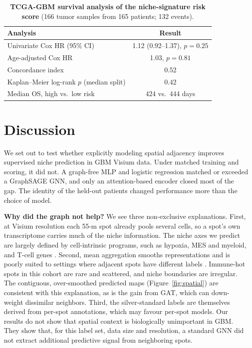 \documentclass[11pt,letterpaper]{article}
\begin{document}
\begin{table}[H]
\centering
\caption{\textbf{TCGA-GBM survival analysis of the niche-signature risk score} (166 tumor samples from 165 patients; 132 events).}
\label{tab:survival}
\small
\begin{tabular}{lc}
\toprule
\textbf{Analysis} & \textbf{Result} \\
\midrule
Univariate Cox HR (95\% CI)        & 1.12 (0.92--1.37), $p = 0.25$ \\
Age-adjusted Cox HR                & 1.03, $p = 0.81$ \\
Concordance index                  & 0.52 \\
Kaplan--Meier log-rank $p$ (median split) & 0.42 \\
Median OS, high vs.\ low risk      & 424 vs.\ 444 days \\
\bottomrule
\end{tabular}
\end{table}

\section{Discussion}

We set out to test whether explicitly modeling spatial adjacency improves supervised niche prediction in GBM Visium data. Under matched training and scoring, it did not. A graph-free MLP and logistic regression matched or exceeded a GraphSAGE GNN, and only an attention-based encoder closed most of the gap. The identity of the held-out patients changed performance more than the choice of model.

\textbf{Why did the graph not help?} We see three non-exclusive explanations. First, at Visium resolution each 55-\textmu m spot already pools several cells, so a spot's own transcriptome carries much of the niche information. The niche axes we predict are largely defined by cell-intrinsic programs, such as hypoxia, MES and myeloid, and T-cell genes \cite{neftel2019,greenwald2024}. Second, mean aggregation smooths representations \cite{li2018deeper} and is poorly suited to settings where adjacent spots have different labels \cite{zhu2020homophily}. Immune-hot spots in this cohort are rare and scattered, and niche boundaries are irregular. The contiguous, over-smoothed predicted maps (Figure~\ref{fig:spatial}) are consistent with this explanation, as is the gain from GAT, which can down-weight dissimilar neighbors. Third, the silver-standard labels are themselves derived from per-spot annotations, which may favour per-spot models. Our results do not show that spatial context is biologically unimportant in GBM. They show that, for this label set, data size and resolution, a standard GNN did not extract additional predictive signal from neighboring spots.
\end{document}
